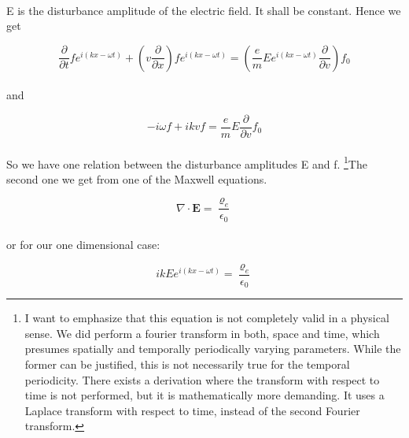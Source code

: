 \documentclass[a4paper,10pt]{report}
\begin{document}
\paragraph*{}
 E is the disturbance amplitude of the electric field. It shall be constant. Hence we get

\begin{equation}
 \frac{\partial }{\partial t} f e^{i(kx-\omega t)} + \left( v \frac{\partial }{\partial x} \right) f e^{i(kx-\omega t)}= \left( \frac{e}{m} E e^{i(kx-\omega t)}\frac{\partial}{\partial v} \right) f_0
\end{equation}

\paragraph*{}
and

\begin{equation}\label{de1}
 -i \omega f  +  ikv  f = \frac{e}{m} E \frac{\partial}{\partial v}  f_0
\end{equation}

\paragraph*{}
So we have one relation between the disturbance amplitudes E and f. \footnote{I want to emphasize that this equation is not completely valid in a physical sense. We did perform a fourier transform in both, space and time, which presumes spatially and temporally periodically varying parameters. While the former can be justified, this is not necessarily true for the temporal periodicity. There exists a derivation where the transform with respect to time is not performed, but it is mathematically more demanding. It uses a Laplace transform with respect to time, instead of the second Fourier transform.}The second one we get from one of the Maxwell equations.

\begin{equation}\label{coloumb}
    \nabla \cdot \mathbf{E} = \frac{\varrho_e}{\epsilon_0}
\end{equation}

\paragraph*{}
or for our one dimensional case:

\begin{equation}\label{coloumb_1D}
     i k E e^{i(kx-\omega t)} = \frac{\varrho_e}{\epsilon_0}
\end{equation}
\end{document}
